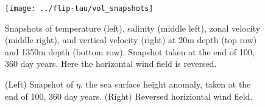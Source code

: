 \documentclass[a4paper,11pt]{article}
\begin{document}
\begin{figure}
\centering
\texttt{[image: ../flip-tau/vol\_snapshots]}
\caption{Snapshots of temperature (left), salinity (middle left), zonal velocity (middle right), and vertical velocity (right) at 20m depth (top row) and 1350m depth (bottom row). Snapshot taken at the end of 100, 360 day years. Here the horizontal wind field is reversed. }
\label{fig:flipVolSnaps}
\end{figure}

\begin{figure}
\centering
{}
\qquad
{}
\caption{(Left) Snapshot of $\eta$, the sea surface height anomaly, taken at the end of 100, 360 day years. (Right) Reversed horiziontal wind field. } 
\label{fig:flipEtaSnap}
\end{figure}
\end{document}
